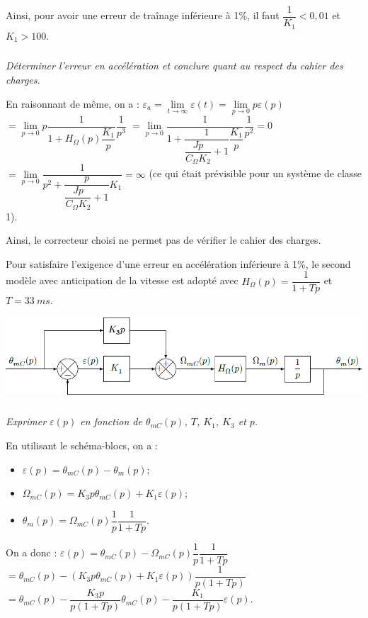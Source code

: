 \documentclass[10pt,fleqn]{article} %
\begin{document}
\begin{multicols}{2}
\begin{corrige}
Ainsi, pour avoir une erreur de traînage inférieure à 1\%, il faut $\dfrac{1}{K_1}<0,01$ et $K_1 >100$.
\end{corrige}
\else
\fi


\subparagraph{}\textit{Déterminer l’erreur en accélération et conclure quant au respect du cahier des charges.}


\ifprof

\begin{corrige}
En raisonnant de même, on a :
 $\varepsilon_a = \lim\limits_{t\to \infty} \varepsilon(t)= \lim\limits_{p\to 0} p\varepsilon(p) $ $= \lim\limits_{p\to 0} p \dfrac{ 1}{ 1+H_{\Omega}(p) \dfrac{K_1}{p}} \dfrac {1}{p^3}$
$= \lim\limits_{p\to 0} \dfrac{ 1}{ 1+\dfrac{1}{\dfrac{Jp}{C_{\Omega} K_2}+1 } \dfrac{K_1}{p}}\dfrac {1}{p^2} = 0$
$= \lim\limits_{p\to 0} \dfrac{ 1}{ p^2+\dfrac{p}{\dfrac{Jp}{C_{\Omega} K_2}+1 } K_1}= \infty$ (ce qui était prévisible pour un système de classe 1).


Ainsi, le correcteur choisi ne permet pas de vérifier le cahier des charges. 
\end{corrige}
\else
\fi

\ifprof
\else
Pour satisfaire l’exigence d’une erreur en accélération inférieure à 1\%, le second modèle avec anticipation de la
vitesse est adopté avec $H_{\Omega}(p)=\dfrac{1}{1+Tp}$ et $T=\SI{33}{ms}$.

\begin{center}
\includegraphics[width=\linewidth]{images/fig_08}
\end{center}
\fi

\subparagraph{}\textit{Exprimer $\varepsilon(p)$ en fonction de $\theta_{mC}(p)$, $T$, $K_1$, $K_3$ et $p$.}
\ifprof

\begin{corrige}
En utilisant le schéma-blocs, on a : 
\begin{itemize}
\item 
$ \varepsilon(p)=\theta_{mC}(p)-\theta_{m}(p)$;
\item  $\Omega_{mC}(p)=K_3 p \theta_{mC}(p) + K_1 \varepsilon(p)$;
\item $\theta_m(p)=\Omega_{mC}(p) \dfrac{1}{p}\dfrac{1}{1+Tp}$. 
\end{itemize}
On a donc : 
$ \varepsilon(p)=\theta_{mC}(p)-\Omega_{mC}(p) \dfrac{1}{p}\dfrac{1}{1+Tp}$ 
$= \theta_{mC}(p)- 
\left(K_3 p \theta_{mC}(p) + K_1 \varepsilon(p)  \right)
\dfrac{1}{p \left( 1+Tp\right)}$
$= \theta_{mC}(p)- 
 \dfrac{K_3 p }{p \left( 1+Tp\right)} \theta_{mC}(p)
-  \dfrac{K_1 }{p \left( 1+Tp\right)} \varepsilon(p)
$. 


\end{corrige}
\end{multicols}
\end{document}
